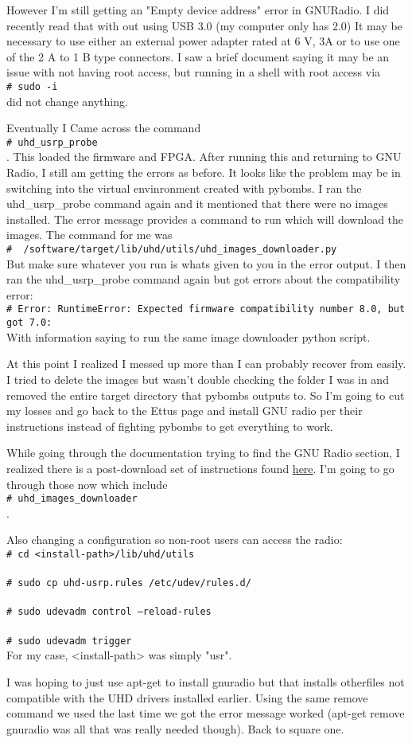 \documentclass{article}
\newcommand{\shellcmd}[1]{\\\indent\indent\texttt{\footnotesize\# #1}\\}
\begin{document}
	However I'm still getting an "Empty device address" error in GNURadio. I did recently read that with out using USB 3.0 (my computer only has 2.0) It may
	be necessary to use either an external power adapter rated at 6 V, 3A or to use one of the 2 A to 1 B type connectors. I saw a brief document
	saying it may be an issue with not having root access, but running in a shell with root access via \shellcmd{sudo -i} did not change anything. 

	Eventually I Came across the command \shellcmd{uhd\_usrp\_probe}. This loaded the firmware and FPGA. After running this and returning to GNU Radio, I still
	am getting the errors as before. It looks like the problem may be in switching into the virtual envinronment created with pybombs. I ran the uhd\_usrp\_probe
	command again and it mentioned that there were no images installed. The error message provides a command to run which will download the images. 
	The command for me was \shellcmd{~/software/target/lib/uhd/utils/uhd\_images\_downloader.py} But make sure whatever you run is whats given to you
	in the error output. I then ran the uhd\_usrp\_probe command again but got errors about the compatibility error:
	\shellcmd{Error: RuntimeError: Expected firmware compatibility number 8.0, but got 7.0:} With information saying to run the same image downloader python
	script. 
	
	At this point I realized I messed up more than I can probably recover from easily. I tried to delete the images but wasn't double checking the folder I was
	in and removed the entire target directory that pybombs outputs to. So I'm going to cut my losses and go back to the Ettus page and install GNU 
	radio per their instructions instead of fighting pybombs to get everything to work. 
	
	While going through the documentation trying to find the GNU Radio section, I realized there is a post-download set of instructions found
	\href{http://files.ettus.com/manual/page\_build\_guide.html#post\_install\_tasks}{here}. I'm going to go through those now which include
	\shellcmd{uhd\_images\_downloader}.  

	Also changing a configuration so non-root users can access the radio:
	\shellcmd{cd <install-path>/lib/uhd/utils}
	\shellcmd{sudo cp uhd-usrp.rules /etc/udev/rules.d/}
	\shellcmd{sudo udevadm control --reload-rules}
	\shellcmd{sudo udevadm trigger}
	For my case, <install-path> was simply "usr". 

	I was hoping to just use apt-get to install gnuradio but that installs otherfiles not compatible with the UHD drivers installed earlier. 
	Using the same remove command we used the last time we got the error message worked (apt-get remove gnuradio was all that was really needed though). 
	Back to square one. 
	
\end{document}
